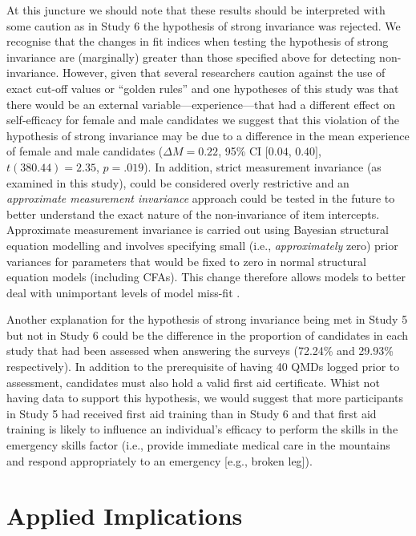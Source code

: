 \documentclass[
  12pt,
  a4paper,
]{book}
\begin{document}
At this juncture we should note that these results should be interpreted with some caution as in Study 6 the hypothesis of strong invariance was rejected. We recognise that the changes in fit indices when testing the hypothesis of strong invariance are (marginally) greater than those specified above for detecting non-invariance. However, given that several researchers caution against the use of exact cut-off values or ``golden rules'' \citep[e.g.,][]{Kline2016, Markland2007} and one hypotheses of this study was that there would be an external variable---experience---that had a different effect on self-efficacy for female and male candidates we suggest that this violation of the hypothesis of strong invariance may be due to a difference in the mean experience of female and male candidates (\(\Delta M = 0.22\), 95\% CI \([0.04\), \(0.40]\), \(t(380.44) = 2.35\), \(p = .019\)). In addition, strict measurement invariance (as examined in this study), could be considered overly restrictive \citep[cf.~][]{Muthen2012} and an \emph{approximate measurement invariance} approach could be tested in the future to better understand the exact nature of the non-invariance of item intercepts. Approximate measurement invariance is carried out using Bayesian structural equation modelling and involves specifying small (i.e., \emph{approximately} zero) prior variances for parameters that would be fixed to zero in normal structural equation models (including CFAs). This change therefore allows models to better deal with unimportant levels of model miss-fit \citep[cf.~][]{Muthen2012, VandeSchoot2013}.

Another explanation for the hypothesis of strong invariance being met in Study 5 but not in Study 6 could be the difference in the proportion of candidates in each study that had been assessed when answering the surveys (72.24\% and 29.93\% respectively). In addition to the prerequisite of having 40 QMDs logged prior to assessment, candidates must also hold a valid first aid certificate. Whist not having data to support this hypothesis, we would suggest that more participants in Study 5 had received first aid training than in Study 6 and that first aid training is likely to influence an individual's efficacy to perform the skills in the emergency skills factor (i.e., provide immediate medical care in the mountains and respond appropriately to an emergency {[}e.g., broken leg{]}).

\hypertarget{self-efficacy-applied-implications}{%
\section{Applied Implications}\label{self-efficacy-applied-implications}}
\end{document}
